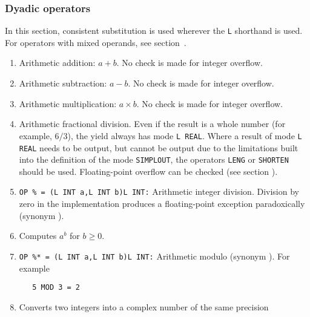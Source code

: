\subsubsection*{Dyadic operators}
In this section, consistent substitution is used wherever the \verb|L|
shorthand is used. For operators with mixed operands, see
section~.
\begin{enumerate}
\item {}\newline
Arithmetic addition: $a+b$. No check is made for integer overflow.
\item {}\newline
Arithmetic subtraction: $a-b$. No check is made for integer
overflow.
\item {}\newline
Arithmetic multiplication: $a\times b$. No check is made for
integer overflow.
\item {}\newline
Arithmetic fractional division. Even if the result is a whole number
(for example, $6/3$), the yield always has mode \verb|L REAL|. Where a
result of mode \verb|L REAL| needs to be output, but cannot be output
due to the limitations built into the definition of the mode
\verb|SIMPLOUT|, the operators \verb|LENG| or \verb|SHORTEN| should be
used. Floating-point overflow can be checked (see
section ).
\item \verb|OP % = (L INT a,L INT b)L INT:|\newline
Arithmetic integer division. Division by zero in the
implementation produces a floating-point exception paradoxically
(synonym ).
\item {}\newline
Computes $a^b$ for $b\geq0$.
\item \verb|OP %* = (L INT a,L INT b)L INT:|\newline
Arithmetic modulo (synonym ). For example
\begin{verbatim}
   5 MOD 3 = 2
\end{verbatim}
\item {}\newline
Converts two integers into a complex number of the same precision

\end{enumerate}
